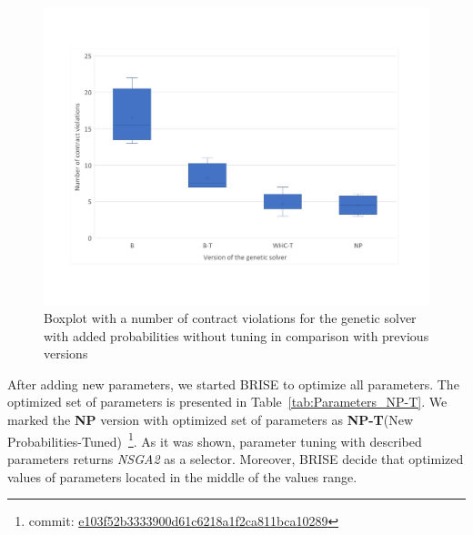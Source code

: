 \begin{figure}
	\centering
	\includegraphics[width=\textwidth]{images/BoxPlotSolverNewParameters.pdf}
	\caption[Boxplot with a number of contract violations for the genetic solver with added probabilities without tuning in comparison with previous versions]{Boxplot with a number of contract violations for the genetic solver with added probabilities without tuning in comparison with previous versions}
	\label{fig:boxplotsolverNewParameters}
\end{figure}

After adding new parameters, we started BRISE to optimize all parameters. The optimized set of parameters is presented in Table~\ref{tab:Parameters_NP-T}. We marked the \textbf{NP} version with optimized set of parameters as \textbf{NP-T}(New Probabilities-Tuned)~\footnote{commit: \href{https://git-st.inf.tu-dresden.de/mquat/mquat2/commit/e103f52b3333900d61c6218a1f2ca811bca10289}{e103f52b3333900d61c6218a1f2ca811bca10289}}. As it was shown, parameter tuning with described parameters returns \textit{NSGA2} as a selector. Moreover, BRISE decide that optimized values of parameters located in the middle of the values range.

